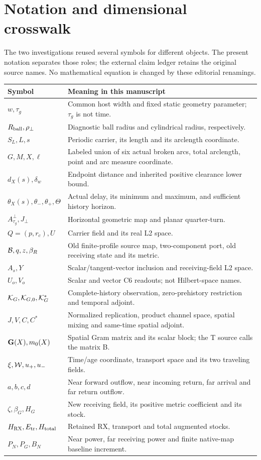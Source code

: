 \section{Notation and dimensional crosswalk}\label{app:notation}
The two investigations reused several symbols for different objects. The present notation separates those roles; the external claim ledger retains the original source names. No mathematical equation is changed by these editorial renamings.

\begin{longtable}{>{\raggedright\arraybackslash}p{}>{\raggedright\arraybackslash}p{}}
\toprule Symbol & Meaning in this manuscript\\\midrule\endhead
$w,\tau_g$ & Common host width and fixed static geometry parameter; $\tau_g$ is not time.\\
$R_{\rm ball},\rho_\perp$ & Diagnostic ball radius and cylindrical radius, respectively.\\
$S_L,L,s$ & Periodic carrier, its length and its arclength coordinate.\\
$G,M,X,\ell$ & Labeled union of six actual broken arcs, total arclength, point and arc measure coordinate.\\
$d_X(s),\delta_w$ & Endpoint distance and inherited positive clearance lower bound.\\
$\theta_X(s),\theta_-,\theta_+,\Theta$ & Actual delay, its minimum and maximum, and sufficient history horizon.\\
$A^\perp_{\tau_g},J_\perp$ & Horizontal geometric map and planar quarter-turn.\\
$Q=(p,r_c),U$ & Carrier field and its real L2 space.\\
$\mathcal B,q,z,\beta_R$ & Old finite-profile source map, two-component port, old receiving state and its metric.\\
$A_s,Y$ & Scalar/tangent-vector inclusion and receiving-field L2 space.\\
$U_o,V_o$ & Scalar and vector C6 readouts; not Hilbert-space names.\\
$\mathcal K_G,\mathcal K_{G,0},\mathcal K_G^*$ & Complete-history observation, zero-prehistory restriction and temporal adjoint.\\
$J,V,C,C^*$ & Normalized replication, product channel space, spatial mixing and same-time spatial adjoint.\\
$\mathbf G(X),m_0(X)$ & Spatial Gram matrix and its scalar block; the T source calls the matrix B.\\
$\xi,\mathcal W,u_+,u_-$ & Time/age coordinate, transport space and its two traveling fields.\\
$a,b,c,d$ & Near forward outflow, near incoming return, far arrival and far return outflow.\\
$\zeta,\beta_G,H_G$ & New receiving field, its positive metric coefficient and its stock.\\
$H_{\rm RX},E_{\rm tr},H_{\rm total}$ & Retained RX, transport and total augmented stocks.\\
$P_N,P_G,B_N$ & Near power, far receiving power and finite native-map baseline increment.\\
\bottomrule
\end{longtable}

